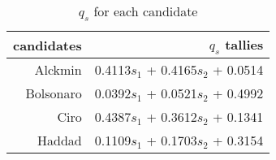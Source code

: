 \begin{table}[H]
  \centering
  \begin{tabular}{rr}
    \hline
    candidates & \(q_{s}\) tallies} \\\hline
    Alckmin & 0.4113\(s_{1}\) + 0.4165\(s_2\) + 0.0514 \\
    Bolsonaro & 0.0392\(s_{1}\) + 0.0521\(s_2\) + 0.4992 \\
    Ciro & 0.4387\(s_{1}\) + 0.3612\(s_2\) + 0.1341 \\
    Haddad & 0.1109\(s_{1}\) + 0.1703\(s_2\) + 0.3154 \\\hline\hline
  \end{tabular}
  \caption{\(q_{s}\) for each candidate}
  \label{tbl:ws}
\end{table}
